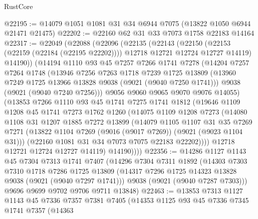 \begin{lexlean}{RustCore}
\begin{coremodule}
@22195 := @14079 @1051 @1081 @31 @34 @6944 @7075 (@13822 @1050 @6944 @21471 @21475)
@22202 := @22160 @62 @31 @33 @7073 @1758 @22183 @14164
@22317 := @22049
    (@22088
      (@22096
        (@22135
          (@22143
            (@22150 (@22153 (@22159 (@22184 (@22195 @22202)))) @12718 @12721 @12724 @12727 @14119)
            @14190))
        (@14194
          @1110
          @93
          @45
          @7257
          @7266
          @1741
          @7278
          (@14204
            @7257
            @7264
            @1748
            (@13946
              @7256
              @7263
              @1718
              @7239
              @1725
              @13809
              (@13960 @7249 @1725 @13966 @13828 @9038 (@9021 (@9040 @7250 @1741)))
              @9038
              (@9021 (@9040 @7240 @7256)))
            @9056
            @9060
            @9065
            @9070
            @9076
            @14055)
          (@13853
            @7266
            @1110
            @93
            @45
            @1741
            @7275
            @1741
            @1812
            (@19646
              @1109
              @1208
              @45
              @1741
              @7273
              @1762
              @1260
              (@14075
                @1109
                @1208
                @7273
                (@14080
                  @1108
                  @31
                  @1207
                  @1885
                  @7272
                  @13899
                  (@14079
                    @1105
                    @1107
                    @31
                    @35
                    @7269
                    @7271
                    (@13822 @1104 @7269 (@9016 (@9017 @7269)) (@9021 (@9023 @1104 @31)))
                    (@22160 @1081 @31 @34 @7073 @7075 @22183 @22202))))
              @12718
              @12721
              @12724
              @12727
              @14119)
            @14190))))
@22356 := @14286
    @1127
    @1143
    @45
    @7304
    @7313
    @1741
    @7407
    (@14296
      @7304
      @7311
      @1892
      (@14303
        @7303
        @7310
        @1718
        @7286
        @1725
        @13809
        (@14317 @7296 @1725 @14323 @13828 @9038 (@9021 (@9040 @7297 @1741)))
        @9038
        (@9021 (@9040 @7287 @7303)))
      @9696
      @9699
      @9702
      @9706
      @9711
      @13848)
@22463 := @13853
    @7313
    @1127
    @1143
    @45
    @7336
    @7357
    @7381
    @7405
    (@14353
      @1125
      @93
      @45
      @7336
      @7345
      @1741
      @7357
      (@14363

\end{coremodule}
\end{lexlean}
